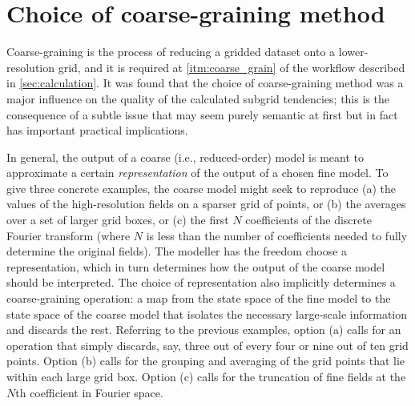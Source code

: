 \documentclass[../main.tex]{subfiles}
\begin{document}
\section{Choice of coarse-graining method}
\label{sec:coarse_graining}
Coarse-graining is the process of reducing a gridded dataset onto a
lower-resolution grid, and it is required at \cref{itm:coarse_grain} of the
workflow described in \cref{sec:calculation}. It was found that the choice of
coarse-graining method was a major influence on the quality of the calculated
subgrid tendencies; this is the consequence of a subtle issue that may seem
purely semantic at first but in fact has important practical implications.

In general, the output of a coarse (i.e., reduced-order) model is meant to
approximate a certain \emph{representation} of the output of a chosen fine
model. To give three concrete examples, the coarse model might seek to
reproduce (a) the values of the high-resolution fields on a sparser grid of
points, or (b) the averages over a set of larger grid boxes, or (c) the first
$N$ coefficients of the discrete Fourier transform (where $N$ is less than the
number of coefficients needed to fully determine the original fields). The
modeller has the freedom choose a representation, which in turn determines how
the output of the coarse model should be interpreted. The choice of
representation also implicitly determines a coarse-graining operation: a map
from the state space of the fine model to the state space of the coarse model
that isolates the necessary large-scale information and discards the rest.
Referring to the previous examples, option (a) calls for an operation that
simply discards, say, three out of every four or nine out of ten grid points.
Option (b) calls for the grouping and averaging of the grid points that lie
within each large grid box. Option (c) calls for the truncation of fine fields
at the $N$th coefficient in Fourier space.
\end{document}
